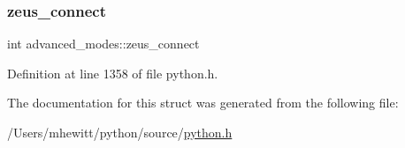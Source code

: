 \subsubsection{\texorpdfstring{zeus\+\_\+connect}{zeus\_connect}}
{\footnotesize\ttfamily int advanced\+\_\+modes\+::zeus\+\_\+connect}



Definition at line 1358 of file python.\+h.



The documentation for this struct was generated from the following file\+:\begin{DoxyCompactItemize}
\item 
/\+Users/mhewitt/python/source/\hyperlink{python_8h}{python.\+h}\end{DoxyCompactItemize}
